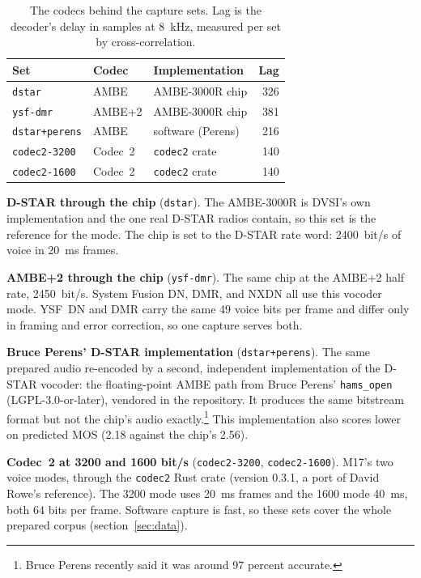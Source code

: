 \documentclass[10pt,twocolumn,a4paper]{article}
\begin{document}
\begin{table}[t]
  \centering\small
  \caption{The codecs behind the capture sets. Lag is the decoder's
  delay in samples at \SI{8}{kHz}, measured per set by cross-correlation.}
  \label{tab:codecs}
  \begin{tabular}{@{}lllr@{}}
    \toprule
    Set & Codec & Implementation & Lag \\
    \midrule
    \texttt{dstar}        & AMBE    & AMBE-3000R chip   & 326 \\
    \texttt{ysf-dmr}      & AMBE+2  & AMBE-3000R chip   & 381 \\
    \texttt{dstar+perens} & AMBE    & software (Perens) & 216 \\
    \texttt{codec2-3200}  & Codec~2 & \texttt{codec2} crate & 140 \\
    \texttt{codec2-1600}  & Codec~2 & \texttt{codec2} crate & 140 \\
    \bottomrule
  \end{tabular}
\end{table}

\textbf{D-STAR through the chip} (\texttt{dstar}). The AMBE-3000R is
DVSI's own implementation and the one real D-STAR radios contain, so
this set is the reference for the mode. The chip is set to the D-STAR
rate word: \SI{2400}{bit/s} of voice in \SI{20}{ms} frames.

\textbf{AMBE+2 through the chip} (\texttt{ysf-dmr}). The same chip at
the AMBE+2 half rate, \SI{2450}{bit/s}. System Fusion DN, DMR, and NXDN
all use this vocoder mode. YSF~DN and DMR carry the same 49 voice bits
per frame and differ only in framing and error correction, so one
capture serves both.

\textbf{Bruce Perens' D-STAR implementation} (\texttt{dstar+perens}).
The same prepared
audio re-encoded by a second, independent implementation of the D-STAR
vocoder: the floating-point AMBE path from Bruce Perens'
\texttt{hams\_open} \cite{perens2026hamsopen} (LGPL-3.0-or-later), vendored in the repository.
It produces the same bitstream format but not the chip's audio exactly.\footnote{Bruce Perens recently said it was around 97 percent accurate.}
This implementation also scores lower on predicted MOS (2.18 against the chip's 2.56).

\textbf{Codec~2 at 3200 and 1600 bit/s} (\texttt{codec2-3200},
\texttt{codec2-1600}). M17's two voice modes, through the
\texttt{codec2} Rust crate (version 0.3.1, a port of David Rowe's
reference). The 3200 mode uses \SI{20}{ms} frames and the 1600 mode
\SI{40}{ms}, both 64 bits per frame. Software capture is fast, so these
sets cover the whole prepared corpus (section~\ref{sec:data}).
\end{document}
